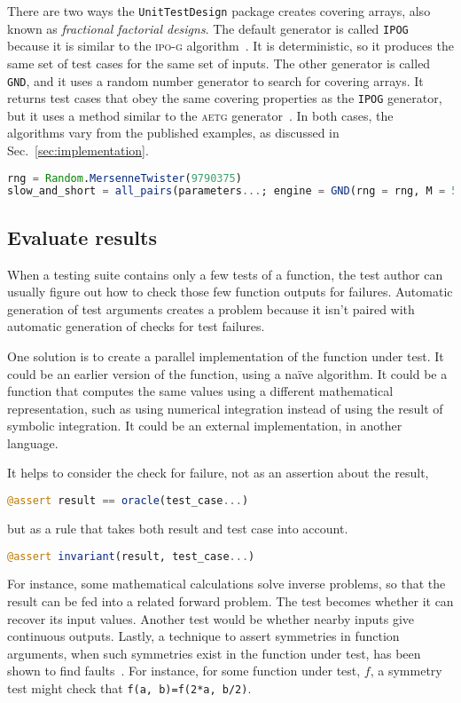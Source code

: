\documentclass{juliacon}
\newcommand{\utd}{\texttt{UnitTestDesign}\xspace}
\begin{document}
\vskip 6pt
There are two ways the \utd package creates covering arrays, also known as \emph{fractional factorial designs}. The default generator is called \verb|IPOG| because it is similar to the \textsc{ipo-g} algorithm~\cite{Lei2008-xt}. It is deterministic, so it produces the same set of test cases for the same set of inputs. The other generator is called \verb|GND|, and it uses a random number generator to search for covering arrays. It returns test cases that obey the same covering properties as the \verb|IPOG| generator, but it uses a method similar to the \textsc{aetg} generator~\cite{Cohen1997-lb}. In both cases, the algorithms vary from the published examples, as discussed in Sec.~\ref{sec:implementation}.

\begin{lstlisting}[language=Julia]
rng = Random.MersenneTwister(9790375)
slow_and_short = all_pairs(parameters...; engine = GND(rng = rng, M = 50))
\end{lstlisting}

\subsection{Evaluate results}\label{sec:results}

When a testing suite contains only a few tests of a function, the test author can usually figure out how to check those few function outputs for failures. Automatic generation of test arguments creates a problem because it isn't paired with automatic generation of checks for test failures.

\vskip 6pt
One solution is to create a parallel implementation of the function under test. It could be an earlier version of the function, using a na{\"i}ve algorithm. It could be a function that computes the same values using a different mathematical representation, such as using numerical integration instead of using the result of symbolic integration. It could be an external implementation, in another language.

\vskip 6pt
It helps to consider the check for failure, not as an assertion about the result,
\begin{lstlisting}[language=Julia]
@assert result == oracle(test_case...)
\end{lstlisting}
but as a rule that takes both result and test case into account.
\begin{lstlisting}[language=Julia]
@assert invariant(result, test_case...)
\end{lstlisting}
For instance, some mathematical calculations solve inverse problems, so that the result can be fed into a related forward problem. The test becomes whether it can recover its input values. Another test would be whether nearby inputs give continuous outputs. Lastly, a technique to assert symmetries in function arguments, when such symmetries exist in the function under test, has been shown to find faults~\cite{Segura2016-qh}. For instance, for some function under test, $f$, a symmetry test might check that \verb|f(a, b)=f(2*a, b/2)|.
\end{document}
